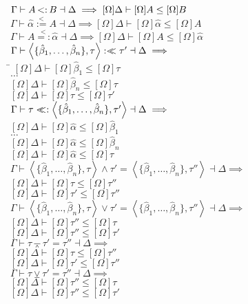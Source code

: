 \documentclass{article}
\newcommand{\st}{\ensuremath{\hspace{-1px}<:\hspace{-1px}}}
\newcommand{\alphahat}{\hat{\alpha}}
\newcommand{\betahat}{\hat{\beta}}
\newcommand{\lub}{\ensuremath{\vee}}
\newcommand{\glb}{\ensuremath{\wedge}}
\newcommand{\instr}{\overset{<}{=:}}
\newcommand{\instl}{\overset{<}{:=}}
\newcommand{\sigbndl}{:<\hspace{-5px}<}
\newcommand{\sigbndr}{<\hspace{-5px}<:}
\newcommand{\pair}[2]{\left<#1,#2\right>}
\begin{document}
\begin{tabbing}
$\Gamma \vdash A \st B \dashv \Delta \implies [\Omega]\Delta \vdash [\Omega]A \leq [\Omega]B$\\
$\Gamma \vdash \alphahat \instl A \dashv \Delta \implies [\Omega]\Delta \vdash [\Omega]\alphahat \leq [\Omega]A$\\
$\Gamma \vdash  A \instr \alphahat \dashv \Delta \implies [\Omega]\Delta \vdash [\Omega]A \leq [\Omega]\alphahat$\\
$\Gamma \vdash \pair{\{\betahat_1,\ldots,\betahat_n\}}{\tau} \sigbndl \tau' \dashv \Delta \implies$\\
\hspace{1em}\= $[\Omega]\Delta \vdash [\Omega]\betahat_1 \leq [\Omega]\tau$\\
\> $\ldots$\\
\> $[\Omega]\Delta \vdash [\Omega]\betahat_n \leq [\Omega]\tau$\\
\> $[\Omega]\Delta \vdash [\Omega]\tau \leq [\Omega]\tau'$\\
$\Gamma \vdash \tau \sigbndr \pair{\{\betahat_1,\ldots,\betahat_n\}}{\tau'} \dashv \Delta \implies$\\
\> $[\Omega]\Delta \vdash [\Omega]\alphahat \leq [\Omega]\betahat_1$\\
\> $\ldots$\\
\> $[\Omega]\Delta \vdash [\Omega]\alphahat \leq [\Omega]\betahat_n$\\
\> $[\Omega]\Delta \vdash [\Omega]\alphahat \leq [\Omega]\tau$\\
$\Gamma \vdash \pair{\{\betahat_1,\ldots,\betahat_n\}}{\tau} \glb \tau' = \pair{\{\betahat_1,\ldots,\betahat_n\}}{\tau''} \dashv \Delta \implies$\\
\> $[\Omega]\Delta \vdash [\Omega]\tau \leq [\Omega]\tau''$\\
\> $[\Omega]\Delta \vdash [\Omega]\tau' \leq [\Omega]\tau''$\\
$\Gamma \vdash \pair{\{\betahat_1,\ldots,\betahat_n\}}{\tau} \lub \tau' = \pair{\{\betahat_1,\ldots,\betahat_n\}}{\tau''} \dashv \Delta \implies$\\
\> $[\Omega]\Delta \vdash [\Omega]\tau'' \leq [\Omega]\tau$\\
\> $[\Omega]\Delta \vdash [\Omega]\tau'' \leq [\Omega]\tau'$\\
$\Gamma \vdash \tau \barwedge \tau' = \tau'' \dashv \Delta \implies$\\
\> $[\Omega]\Delta \vdash [\Omega]\tau \leq [\Omega]\tau''$\\
\> $[\Omega]\Delta \vdash [\Omega]\tau' \leq [\Omega]\tau''$\\
$\Gamma \vdash \tau \veebar \tau' = \tau'' \dashv \Delta \implies$\\
\> $[\Omega]\Delta \vdash [\Omega]\tau'' \leq [\Omega]\tau$\\
\> $[\Omega]\Delta \vdash [\Omega]\tau'' \leq [\Omega]\tau'$\\
\end{tabbing}
\end{document}
